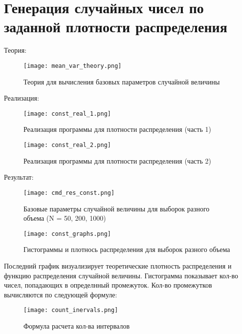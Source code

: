 \chapter{Генерация случайных чисел по заданной плотности распределения}
\label{ch:intro}

Теория:\\

\begin{figure}[H]
    \centering
    \texttt{[image: mean\_var\_theory.png]}
    \caption{Теория для вычисления базовых параметров случайной величины}
\end{figure}

Реализация:\\

\begin{figure}[H]
    \centering
    \texttt{[image: const\_real\_1.png]}
    \caption{Реализация программы для плотности распределения (часть 1)}
\end{figure}


\begin{figure}[H]
    \centering
    \texttt{[image: const\_real\_2.png]}
    \caption{Реализация программы для плотности распределения (часть 2)}
\end{figure}

Результат: \\

\begin{figure}[H]
    \centering
    \texttt{[image: cmd\_res\_const.png]}
    \caption{Базовые параметры случайной величины для выборок разного объема (N = 50, 200, 1000)}
\end{figure}


\begin{figure}[ht]
    \centering
    \texttt{[image: const\_graphs.png]}
    \caption{Гистограммы и плотнось распределения для выборок разного объема}
\end{figure}

Последний график визуализирует теоретические плотность распределения и функцию распределения случайной величины.
Гистограмма показывает кол-во чисел, попадающих в определнный промежуток. Кол-во промежутков вычисляются по следующей формуле:

\begin{figure}[ht]
    \centering
    \texttt{[image: count\_inervals.png]}
    \caption{Формула расчета кол-ва интервалов}
\end{figure}



\endinput